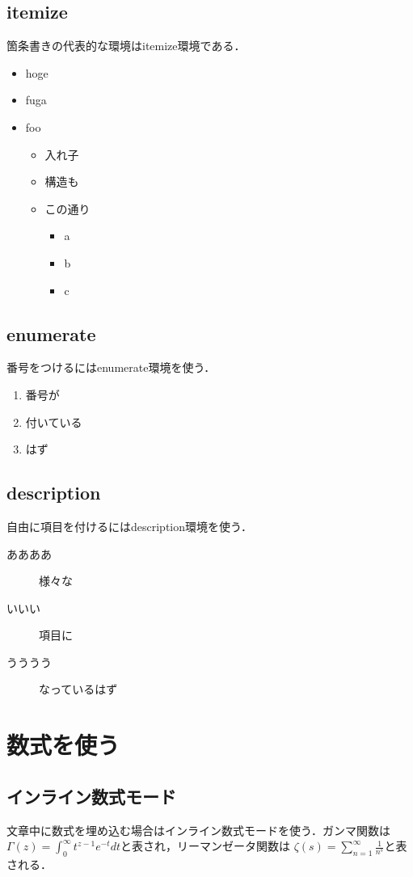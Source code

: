 \documentclass[a4j,titlepage,dvipdfmx,uplatex]{jsarticle}   %
\begin{document}
  \subsection{itemize}
  箇条書きの代表的な環境はitemize環境である．
  \begin{itemize}
    \item hoge
    \item fuga
    \item foo
    \begin{itemize}
      \item 入れ子
      \item 構造も
      \item この通り
      \begin{itemize}
        \item a
        \item b
        \item c
      \end{itemize}
    \end{itemize}
  \end{itemize}

  \subsection{enumerate}
  番号をつけるにはenumerate環境を使う．
  \begin{enumerate}
      \item 番号が
      \item 付いている
      \item はず
  \end{enumerate}

  \subsection{description}
  自由に項目を付けるにはdescription環境を使う．
  \begin{description}
      \item[ああああ] 様々な
      \item[いいい] 項目に
      \item[うううう] なっているはず
  \end{description}
  \section{数式を使う}
  \subsection{インライン数式モード}
  文章中に数式を埋め込む場合はインライン数式モードを使う．ガンマ関数は
  $\Gamma(z)=\int_0^\infty t^{z-1}e^{-t}dt$と表され，リーマンゼータ関数は
  $\zeta(s)=\sum_{n=1}^\infty\frac{1}{n^s}$と表される．
\end{document}
